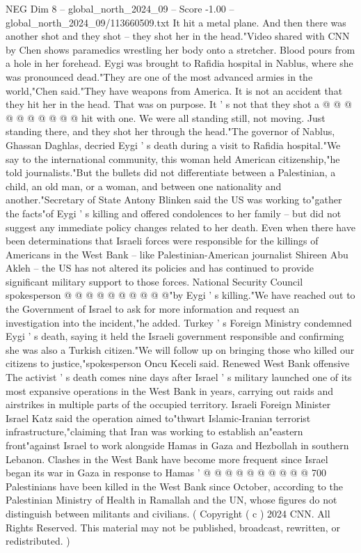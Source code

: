 \begin{textsample}{NEG Dim 8 – global\_north\_2024\_09 – Score -1.00 – global\_north\_2024\_09/113660509.txt}
It hit a metal plane.
And then there was another shot and they shot -- they shot her in the head."Video shared with CNN by Chen shows paramedics wrestling her body onto a stretcher.
Blood pours from a hole in her forehead.
Eygi was brought to Rafidia hospital in Nablus, where she was pronounced dead."They are one of the most advanced armies in the world,"Chen said."They have weapons from America.
It is not an accident that they hit her in the head.
That was on purpose.
It ' s not that they shot a @ @ @ @ @ @ @ @ @ @ hit with one.
We were all standing still, not moving.
Just standing there, and they shot her through the head."The governor of Nablus, Ghassan Daghlas, decried Eygi ' s death during a visit to Rafidia hospital."We say to the international community, this woman held American citizenship,"he told journalists."But the bullets did not differentiate between a Palestinian, a child, an old man, or a woman, and between one nationality and another."Secretary of State Antony Blinken said the US was working to"gather the facts"of Eygi ' s killing and offered condolences to her family -- but did not suggest any immediate policy changes related to her death.
Even when there have been determinations that Israeli forces were responsible for the killings of Americans in the West Bank -- like Palestinian-American journalist Shireen Abu Akleh -- the US has not altered its policies and has continued to provide significant military support to those forces.
National Security Council spokesperson @ @ @ @ @ @ @ @ @ @"by Eygi ' s killing."We have reached out to the Government of Israel to ask for more information and request an investigation into the incident,"he added.
Turkey ' s Foreign Ministry condemned Eygi ' s death, saying it held the Israeli government responsible and confirming she was also a Turkish citizen."We will follow up on bringing those who killed our citizens to justice,"spokesperson Oncu Keceli said.
Renewed West Bank offensive The activist ' s death comes nine days after Israel ' s military launched one of its most expansive operations in the West Bank in years, carrying out raids and airstrikes in multiple parts of the occupied territory.
Israeli Foreign Minister Israel Katz said the operation aimed to"thwart Islamic-Iranian terrorist infrastructure,"claiming that Iran was working to establish an"eastern front"against Israel to work alongside Hamas in Gaza and Hezbollah in southern Lebanon.
Clashes in the West Bank have become more frequent since Israel began its war in Gaza in response to Hamas ' @ @ @ @ @ @ @ @ @ @ 700 Palestinians have been killed in the West Bank since October, according to the Palestinian Ministry of Health in Ramallah and the UN, whose figures do not distinguish between militants and civilians. ( Copyright ( c ) 2024 CNN.
All Rights Reserved.
This material may not be published, broadcast, rewritten, or redistributed. )

\end{textsample}
